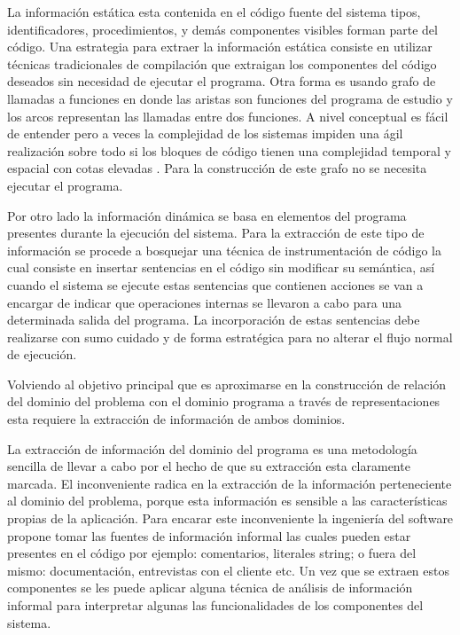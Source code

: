 \documentclass[12pt]{report}
\begin{document}
La información estática esta contenida en el código fuente del sistema 
tipos, identificadores, procedimientos, y demás componentes visibles forman parte del código. Una estrategia para extraer la información estática consiste en utilizar técnicas tradicionales de compilación que extraigan los componentes del código deseados sin necesidad de ejecutar el programa.
Otra forma es usando grafo de llamadas a funciones en donde las aristas son funciones del programa de estudio y los arcos representan las llamadas entre dos funciones. A nivel conceptual es fácil de entender pero a veces la complejidad de los sistemas impiden una ágil realización sobre todo si los bloques de código tienen una complejidad temporal y espacial con cotas elevadas \cite{MBPHRU10}. Para la construcción de este grafo no se necesita ejecutar el programa.

Por otro lado la información dinámica se basa en elementos del programa presentes durante la ejecución del sistema. Para la extracción de este tipo de información se procede a bosquejar una técnica de instrumentación de código la cual consiste en insertar sentencias en el código sin modificar su semántica, así cuando el sistema se ejecute estas sentencias que contienen acciones se van a encargar de indicar que operaciones internas se llevaron a cabo para una determinada salida del programa.
La incorporación de estas sentencias debe realizarse con sumo cuidado y de forma estratégica para no alterar el flujo normal de ejecución.

Volviendo al objetivo principal que es aproximarse en la construcción de relación del dominio del problema con el dominio programa a través de representaciones esta requiere la extracción de información de ambos dominios.

La extracción de información del dominio del programa es una metodología sencilla de llevar a cabo por el hecho de que su extracción esta claramente marcada. El inconveniente radica en la extracción de la información perteneciente al dominio del problema, porque esta información es sensible a las características propias de la aplicación. Para encarar este inconveniente la ingeniería del software propone tomar las fuentes de información informal las cuales pueden estar presentes en el código por ejemplo: comentarios, literales string; o fuera del mismo: documentación, entrevistas con el cliente etc. Un vez que se extraen estos componentes se les puede aplicar alguna técnica de análisis de información informal para interpretar algunas las funcionalidades de los componentes del sistema.
\end{document}
